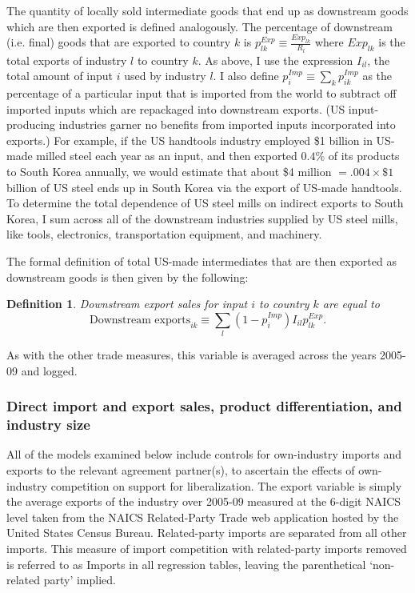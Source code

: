 \documentclass[hidelinks,12pt,letter]{article}
\newtheorem{defi}{Definition}
\begin{document}
The quantity of locally sold intermediate goods that end up as downstream goods which are then exported is defined analogously. The percentage of downstream (i.e. final) goods that are exported to country $k$ is $p^{Exp}_{lk} \equiv \frac{Exp_{lk}}{R_l}$ where $Exp_{lk}$ is the total exports of industry $l$ to country $k$. As above, I use the expression $I_{il}$, the total amount of input $i$ used by industry $l$. I also define $p^{Imp}_{i} \equiv \sum\limits_k p^{Imp}_{ik}$ as the percentage of a particular input that is imported from the world to subtract off imported inputs which are repackaged into downstream exports. (US input-producing industries garner no benefits from imported inputs incorporated into exports.) For example, if the US handtools industry employed \$1 billion in US-made milled steel each year as an input, and then exported $0.4\%$ of its products to South Korea annually, we would estimate that about \$4 million $=.004\times \$1 $ billion of US steel ends up in South Korea via the export of US-made handtools. To determine the total dependence of US steel mills on indirect exports to South Korea, I sum across all of the downstream industries supplied by US steel mills, like tools, electronics, transportation equipment, and machinery.

The formal definition of total US-made intermediates that are then exported as downstream goods is then given by the following:
\begin{defi}
Downstream export sales for input $i$ to country $k$ are  equal to $$\mathrm{Downstream\phantom{'}exports}_{ik} \equiv \sum\limits_l (1-p^{Imp}_i)I_{il}p^{Exp}_{lk}.$$
\end{defi}   
\noindent As with the other trade measures, this variable is  averaged across the years 2005-09 and logged.

\subsubsection*{Direct import and export sales, product differentiation, and industry size}
All of the models examined below include controls for own-industry imports and exports to the relevant agreement partner(s), to ascertain the effects of own-industry competition on support for liberalization. The export variable is simply the average exports of the industry over 2005-09 measured at the 6-digit NAICS level taken from the NAICS Related-Party Trade web application hosted by the United States Census Bureau. Related-party imports are separated from all other imports. This measure of import competition with related-party imports removed is referred to as Imports in all regression tables, leaving the parenthetical `non-related party' implied.
\end{document}
